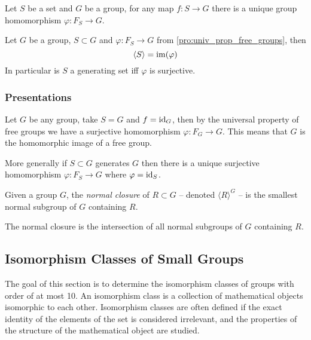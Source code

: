 \begin{proposition}\label{pro:univ_prop_free_groups}
   Let \(S\) be a set and \(G\) be a group, for any map \(f: S \to G\) there is a unique group homomorphism \(\varphi: F_S \to G\).
   \begin{center}
   \end{center}
\end{proposition}

\begin{proposition}
   Let \(G\) be a group, \(S \subset G\) and \(\varphi: F_S \to G\) from \ref{pro:univ_prop_free_groups}, then
   \[\langle S \rangle = \operatorname{im}(\varphi)\]
   In particular is \(S\) a generating set iff \(\varphi\) is surjective.
\end{proposition}

\subsubsection{Presentations}
Let \(G\) be any group, take \(S = G\) and \(f = \operatorname{id}_G\), then by the universal property of free groups we have a surjective homomorphism \(\varphi: F_G \to G\).
This means that \(G\) is the homomorphic image of a free group.

More generally if \(S \subset G\) generates \(G\) then there is a unique surjective homomorphism \(\varphi: F_S \to G\) where \(\varphi = \operatorname{id}_S\).

\begin{definition}
   Given a group \(G\), the \emph{normal closure} of \(R \subset G\) -- denoted \(\langle R \rangle^G\) -- is the smallest normal subgroup of \(G\) containing \(R\).
\end{definition}
\begin{remark}
   The normal closure is the intersection of all normal subgroups of \(G\) containing \(R\).
\end{remark}

\subsection{Isomorphism Classes of Small Groups}
The goal of this section is to determine the isomorphism classes of groups with order of at most 10.
An isomorphism class is a collection of mathematical objects isomorphic to each other.
Isomorphism classes are often defined if the exact identity of the elements of the set is considered irrelevant, and the properties of the structure of the mathematical object are studied.

